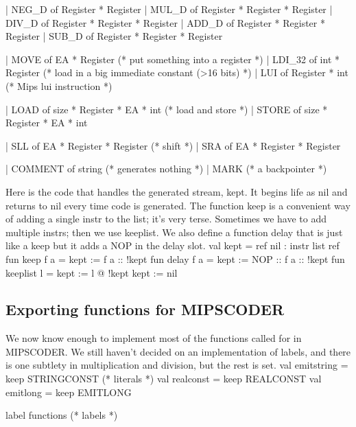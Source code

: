   | NEG_D of Register * Register
  | MUL_D of Register * Register * Register
  | DIV_D of Register * Register * Register
  | ADD_D of Register * Register * Register
  | SUB_D of Register * Register * Register

  | MOVE of EA * Register    (* put something into a register *)
  | LDI_32 of int * Register (* load in a big immediate constant (>16 bits) *)
  | LUI of Register * int    (* Mips lui instruction *)

  | LOAD of size * Register * EA * int  (* load and store *)
  | STORE  of size * Register * EA * int

  | SLL of EA * Register * Register     (* shift *)
  | SRA of EA * Register * Register

  | COMMENT of string                   (* generates nothing *)
  | MARK                                (* a backpointer *)
\endcode
{}

Here is the code that handles the generated stream, \code{}kept\edoc{}.
It begins life as \code{}nil\edoc{} and returns to \code{}nil\edoc{} every time code is
generated.
The function \code{}keep\edoc{} is a convenient way of adding a single \code{}instr\edoc{} to
the list; it's very terse.
Sometimes we have to add multiple \code{}instr\edoc{}s; then we use \code{}keeplist\edoc{}.
We also define a function \code{}delay\edoc{} that is just like a \code{}keep\edoc{} but
it adds a NOP in the delay slot.
\enddocs
{}
\endmoddef
  val kept = ref nil : instr list ref
  fun keep f a = kept := f a :: !kept
  fun delay f a = kept := NOP :: f a :: !kept
  fun keeplist l = kept := l @ !kept
\endcode
{}
\endmoddef
  kept := nil
\endcode
{}

\subsection{Exporting functions for \code{}MIPSCODER\edoc{}}
We now know enough to implement most of the functions called for in
\code{}MIPSCODER\edoc{}.
We still haven't decided on an implementation of labels,
and there is one subtlety in multiplication and division,
but the rest is set.
\enddocs
{}
\endmoddef
  val emitstring = keep STRINGCONST     (* literals *)
  val realconst = keep REALCONST
  val emitlong = keep EMITLONG

  \LA{}label functions\RA{}                   (* labels *)

